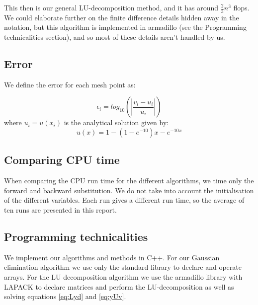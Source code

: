 This then is our general LU-decomposition method, and it has around
$\frac{2}{3}n^3$ flops. We could elaborate further on the finite difference
details hidden away in the notation, but this algorithm is implemented in
armadillo (see the Programming technicalities section), and so most of these details
aren't handled by us.

\subsection{Error}
\label{sec:error}

We define the error for each mesh point as:

	\begin{equation}
	\epsilon_i=log_{10}\left(\left|\frac{v_i-u_i}{u_i}\right|\right)
	\end{equation}
where $u_i=u(x_i)$ is the analytical solution given by:
\begin{equation}
u(x) = 1-(1-e^{-10})x-e^{-10x}
\end{equation}

\subsection{Comparing CPU time}
When comparing the CPU run time for the different algorithms, we time only the forward and backward substitution. We do not take into account the initialisation of the different variables. Each run gives a different run time, so the average of ten runs are presented in this report.  

\subsection{Programming technicalities}
\label{sec:proglang}

We implement our algorithms and methods in C++. For our Gaussian elimination
algorithm we use only the standard library to declare and operate arrays.
For the LU decomposition algorithm we use the armadillo library with LAPACK to
declare matrices and perform the LU-decomposition as well as solving equations
\ref{eq:Lyd} and \ref{eq:yUv}.
